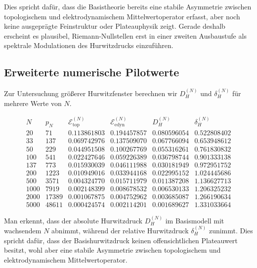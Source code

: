 \documentclass[12pt,a4paper]{article}
\theoremstyle{definition}
\begin{document}
	Dies spricht dafür, dass die Basistheorie bereits eine stabile Asymmetrie zwischen topologischem und elektrodynamischem Mittelwertoperator erfasst, aber noch keine ausgeprägte Feinstruktur oder Plateauphysik zeigt. Gerade deshalb erscheint es plausibel, Riemann-Nullstellen erst in einer zweiten Ausbaustufe als spektrale Modulationen des Hurwitzdrucks einzuführen.
	
	\subsection{Erweiterte numerische Pilotwerte}
	
	Zur Untersuchung größerer Hurwitzfenster berechnen wir \(D_H^{(N)}\) und \(\delta_H^{(N)}\) für mehrere Werte von \(N\).
	
	\[
	\begin{array}{r|r|r|r|r|r}
		N & p_N & \mathcal E_{\mathrm{top}}^{(N)} & \mathcal E_{\mathrm{edyn}}^{(N)} & D_H^{(N)} & \delta_H^{(N)} \\
		\hline
		20   & 71    & 0.113861803 & 0.194457857 & 0.080596054 & 0.522808402 \\
		33   & 137   & 0.069742976 & 0.137509070 & 0.067766094 & 0.653948612 \\
		50   & 229   & 0.044951508 & 0.100267769 & 0.055316261 & 0.761830832 \\
		100  & 541   & 0.022427646 & 0.059226389 & 0.036798744 & 0.901333138 \\
		137  & 773   & 0.015930039 & 0.046111988 & 0.030181949 & 0.972951752 \\
		200  & 1223  & 0.010949016 & 0.033944168 & 0.022995152 & 1.024445686 \\
		500  & 3571  & 0.004324770 & 0.015711979 & 0.011387208 & 1.136627713 \\
		1000 & 7919  & 0.002148399 & 0.008678532 & 0.006530133 & 1.206325232 \\
		2000 & 17389 & 0.001067875 & 0.004752962 & 0.003685087 & 1.266190634 \\
		5000 & 48611 & 0.000424574 & 0.002114201 & 0.001689627 & 1.331033664
	\end{array}
	\]
	
	Man erkennt, dass der absolute Hurwitzdruck \(D_H^{(N)}\) im Basismodell mit wachsendem \(N\) abnimmt, während der relative Hurwitzdruck \(\delta_H^{(N)}\) zunimmt. Dies spricht dafür, dass der Basishurwitzdruck keinen offensichtlichen Plateauwert besitzt, wohl aber eine stabile Asymmetrie zwischen topologischem und elektrodynamischem Mittelwertoperator.
	
\end{document}
